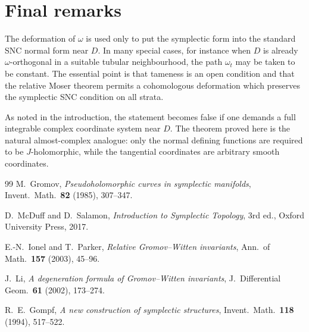 \documentclass[11pt]{article}
\theoremstyle{definition}
\numberwithin{equation}{section}
\begin{document}
\section{Final remarks}

The deformation of $\omega$ is used only to put the symplectic form into the standard SNC normal form near $D$.  In many special cases, for instance when $D$ is already $\omega$-orthogonal in a suitable tubular neighbourhood, the path $\omega_t$ may be taken to be constant.  The essential point is that tameness is an open condition and that the relative Moser theorem permits a cohomologous deformation which preserves the symplectic SNC condition on all strata.

As noted in the introduction, the statement becomes false if one demands a full integrable complex coordinate system near $D$.  The theorem proved here is the natural almost-complex analogue: only the normal defining functions are required to be $J$-holomorphic, while the tangential coordinates are arbitrary smooth coordinates.

\begin{thebibliography}{99}
M.~Gromov, \emph{Pseudoholomorphic curves in symplectic manifolds}, Invent.\ Math.\ \textbf{82} (1985), 307--347.

D.~McDuff and D.~Salamon, \emph{Introduction to Symplectic Topology}, 3rd ed., Oxford University Press, 2017.

E.-N.~Ionel and T.~Parker, \emph{Relative Gromov--Witten invariants}, Ann.\ of Math.\ \textbf{157} (2003), 45--96.

J.~Li, \emph{A degeneration formula of Gromov--Witten invariants}, J.\ Differential Geom.\ \textbf{61} (2002), 173--274.

R.~E.~Gompf, \emph{A new construction of symplectic structures}, Invent.\ Math.\ \textbf{118} (1994), 517--522.
\end{thebibliography}
\end{document}

